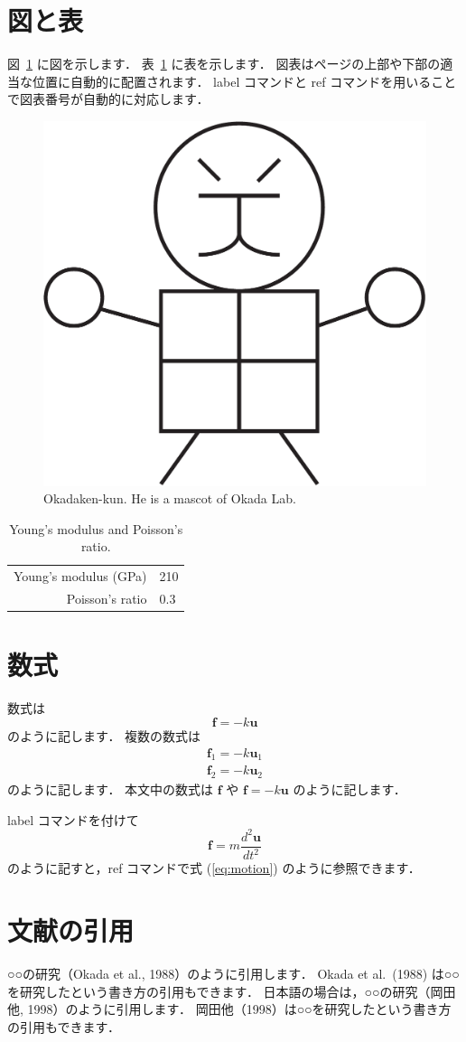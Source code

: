 \section{図と表}
図~\ref{fig:okadakenkun} に図を示します．
表~\ref{tab:parameters} に表を示します．
図表はページの上部や下部の適当な位置に自動的に配置されます．
label コマンドと ref コマンドを用いることで図表番号が自動的に対応します．
\begin{figure}[tbp]
 \centering
 \includegraphics[width=0.3\hsize]{fig/okadakenkun.pdf}  %
 \caption{Okadaken-kun. He is a mascot of Okada Lab.}\label{fig:okadakenkun}
\end{figure}
\begin{table}[tbp]
 \centering
 \caption{Young's modulus and Poisson's ratio.}\label{tab:parameters}
 \begin{tabular}{rl}
  \toprule
  Young's modulus (GPa) & 210 \\
  Poisson's ratio & 0.3 \\
  \bottomrule
 \end{tabular}
\end{table}
\section{数式}
数式は
\begin{equation}
 \bm{f} = -k \bm{u}
\end{equation}
のように記します．
複数の数式は
\begin{align}
 \bm{f}_1 = -k \bm{u}_1 \\
 \bm{f}_2 = -k \bm{u}_2
\end{align}
のように記します．
本文中の数式は $\bm{f}$ や $\bm{f} = -k \bm{u}$ のように記します．

label コマンドを付けて
\begin{equation}
 \bm{f} = m \frac{d^2 \bm{u}}{d t^2}\label{eq:motion}
\end{equation}
のように記すと，ref コマンドで式 (\ref{eq:motion}) のように参照できます．
\section{文献の引用}
○○の研究（Okada et al., 1988）のように引用します．
Okada et al.\ (1988) は○○を研究したという書き方の引用もできます．
日本語の場合は，○○の研究（岡田他, 1998）のように引用します．
岡田他（1998）は○○を研究したという書き方の引用もできます．
